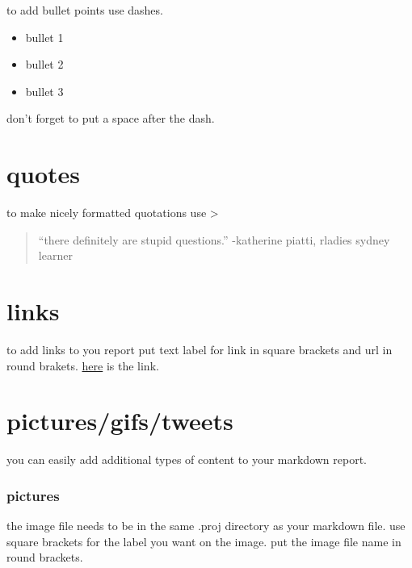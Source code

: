 \documentclass[
]{article}
\providecommand{\tightlist}{%
  \setlength{\itemsep}{0pt}\setlength{\parskip}{0pt}}
\begin{document}
to add bullet points use dashes.

\begin{itemize}
\tightlist
\item
  bullet 1
\item
  bullet 2
\item
  bullet 3
\end{itemize}

don't forget to put a space after the dash.

\hypertarget{quotes}{%
\section{quotes}\label{quotes}}

to make nicely formatted quotations use \textgreater{}

\begin{quote}
``there definitely are stupid questions.'' -katherine piatti, rladies
sydney learner
\end{quote}

\hypertarget{links}{%
\section{links}\label{links}}

to add links to you report put text label for link in square brackets
and url in round brakets.
\href{https://rladiessydney.org/courses/ryouwithme/04-markymark-1/}{here}
is the link.

\hypertarget{picturesgifstweets}{%
\section{pictures/gifs/tweets}\label{picturesgifstweets}}

you can easily add additional types of content to your markdown report.

\hypertarget{pictures}{%
\subsubsection{pictures}\label{pictures}}

the image file needs to be in the same .proj directory as your markdown
file. use square brackets for the label you want on the image. put the
image file name in round brackets.
\end{document}
